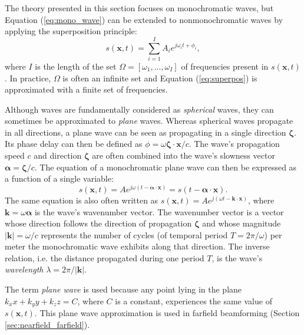 The theory presented in this section focuses on monochromatic waves, but Equation (\ref{eq:mono_wave}) can be extended to nonmonochromatic waves by applying the superposition principle:
\begin{equation}
    s(\boldsymbol{x},t) = \sum_{i=1}^I A_i e^{j \omega_i t + \phi_i},
\label{eq:superpos}
\end{equation}
\noindent
where $I$ is the length of the set $\Omega = [\omega_1, ..., \omega_I]$ of frequencies present in $s(\boldsymbol{x},t)$.
In practice, $\Omega$ is often an infinite set and Equation (\ref{eq:superpos}) is approximated with a finite set of frequencies.

Although waves are fundamentally considered as \textit{spherical} waves, they can sometimes be approximated to \textit{plane} waves.
Whereas spherical waves propagate in all directions, a plane wave can be seen as propagating in a single direction $\boldsymbol{\zeta}$.
Its phase delay can then be defined as $\phi = \omega \boldsymbol{\zeta} \cdot \boldsymbol{x} / c$.
The wave's propagation speed $c$ and direction $\boldsymbol{\zeta}$ are often combined into the wave's slowness vector $\boldsymbol{\alpha} = \boldsymbol{\zeta} / c$.
The equation of a monochromatic plane wave can then be expressed as a function of a single variable:
\begin{equation}
    s(\boldsymbol{x},t) = A e^{j \omega ( t - \boldsymbol{\alpha} \cdot \boldsymbol{x})} = s(t - \boldsymbol{\alpha} \cdot \boldsymbol{x}).
\label{eq:mono_plane_wave}
\end{equation}
\noindent
The same equation is also often written as $s(\boldsymbol{x},t) = A e^{j (\omega t - \boldsymbol{k} \cdot \boldsymbol{x})}$, where $\boldsymbol{k} = \omega \boldsymbol{\alpha}$ is the wave's wavenumber vector.
The wavenumber vector is a vector whose direction follows the direction of propagation $\boldsymbol{\zeta}$ and whose magnitude $|\boldsymbol{k}| = \omega / c$ represents the number of cycles (of temporal period $T = 2\pi / \omega$) per meter the monochromatic wave exhibits along that direction. The inverse relation, i.e. the distance propagated during one period $T$, is the wave's \textit{wavelength} $\lambda = 2\pi / |\boldsymbol{k}|$.

The term \textit{plane wave} is used because any point lying in the plane $k_x x + k_y y + k_z z = C$, where $C$ is a constant, experiences the same value of $s(\boldsymbol{x},t)$.
This plane wave approximation is used in farfield beamforming (Section \ref{sec:nearfield_farfield}).

